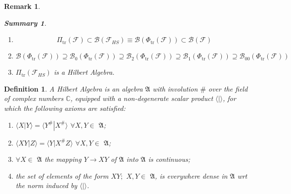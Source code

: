 \documentclass[aps, preprint]{revtex4}
\newtheorem{definition}[theorem]{Definition}
\newtheorem{remark}[theorem]{Remark}
\newtheorem{summary}[theorem]{Summary}
\begin{document}
\begin{remark}
\begin{summary}
\begin{enumerate}
\item
\begin{equation}\Pi _{\ensuremath{\operatorname*{tr}}} \left (\mathcal{F}\right ) \subset \mathcal{B} \left (\mathcal{F}_{H S}\right ) \equiv \mathcal{B} \left (\Phi _{\ensuremath{\operatorname*{tr}}} \left (\mathcal{F}\right )\right ) \subset \mathcal{B} \left (\mathcal{F}\right )
\end{equation}

\item
\begin{equation}\mathcal{B} \left (\Phi _{\ensuremath{\operatorname*{tr}}} \left (\mathcal{F}\right )\right ) \supseteq \mathcal{B}_{0} \left (\Phi _{\ensuremath{\operatorname*{tr}}} \left (\mathcal{F}\right )\right ) \supseteq \mathcal{B}_{2} \left (\Phi _{\ensuremath{\operatorname*{tr}}} \left (\mathcal{F}\right )\right ) \supseteq \mathcal{B}_{1} \left (\Phi _{\ensuremath{\operatorname*{tr}}} \left (\mathcal{F}\right )\right ) \supseteq \mathcal{B}_{0 0} \left (\Phi _{\ensuremath{\operatorname*{tr}}} \left (\mathcal{F}\right )\right )
\end{equation}

\item $\Pi _{\ensuremath{\operatorname*{tr}}} \left (\mathcal{F}_{H S}\right )$ is a \emph{Hilbert Algebra}. \end{enumerate}
\end{summary}


\end{remark}


\begin{definition}
A Hilbert Algebra is an algebra $\mathfrak{A}$ with involution $\#$ over the field of complex numbers $\mathbb{C}$, equipped with a non-degenerate scalar product $ \langle \left .\text{}\right \vert  \rangle $, for which the following axioms are satisfied: 


\begin{enumerate}
\item $ \langle \left .X\right \vert Y \rangle  = \langle \left .Y^{\#}\right \vert X^{\#} \rangle $ $ \forall X ,Y \in $ $\mathfrak{A}$; 

\item $ \langle \left .X Y\right \vert Z \rangle  = \langle \left .Y\right \vert X^{\#} Z \rangle $ $ \forall X ,Y \in $ $\mathfrak{A}$; 

\item $ \forall X \in $ $\mathfrak{A}$ the mapping $Y \rightarrow X Y$ of $\mathfrak{A}$ into $\mathfrak{A}$ is continuous; 

\item the set of elements of the form $X Y ;$ $X ,Y \in $ $\mathfrak{A}$, is everywhere dense in $\mathfrak{A}$ wrt the norm induced by $ \langle \left .\text{}\right \vert  \rangle $. \end{enumerate}
\end{definition}
\end{document}
